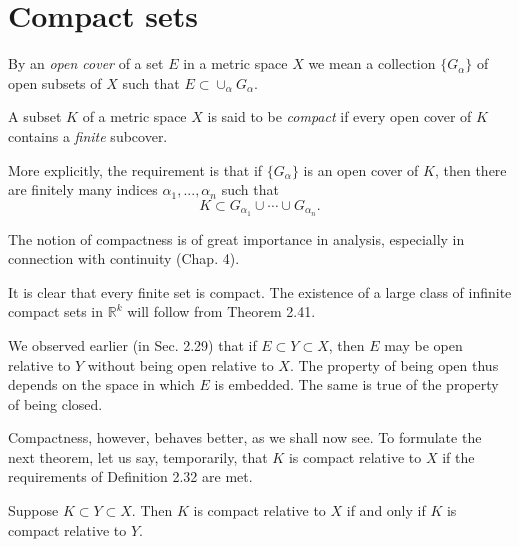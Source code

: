 \section{Compact sets}

\begin{myDefinition}
    \label{myDefinition:2.31 open cover}
    By an \emph{open cover} of a set $E$ in a metric space $X$ we mean a collection $\{G_{\alpha}\}$ of open subsets of $X$ such that $E \subset \cup_{\alpha} G_{\alpha}$.
\end{myDefinition}

\begin{myDefinition}
    \label{myDefinition:2.32 compact set}
    A subset $K$ of a metric space $X$ is said to be \emph{compact} if every open cover of $K$ contains a \emph{finite} subcover.
\end{myDefinition}

More explicitly, the requirement is that if $\{G_{\alpha}\}$ is an open cover of $K$, then there are finitely many indices $\alpha_1, ..., \alpha_n$ such that
\begin{equation*}
    K \subset G_{\alpha_{1}} \cup \cdots \cup G_{\alpha_{n}}.
\end{equation*}

The notion of compactness is of great importance in analysis, especially
in connection with continuity (Chap. 4).

It is clear that every finite set is compact. The existence of a large class of infinite compact sets in $\mathbb{R}^k$ will follow from Theorem 2.41.

We observed earlier (in Sec. 2.29) that if $E \subset Y \subset X$, then $E$ may be open relative to $Y$ without being open relative to $X$. The property of being open thus depends on the space in which $E$ is embedded. The same is true of the property of being closed.

Compactness, however, behaves better, as we shall now see. To formulate the next theorem, let us say, temporarily, that $K$ is compact relative to $X$ if the requirements of Definition 2.32 are met.

\begin{thm}
    \label{thm:2.33 compact relative}
    Suppose $K \subset Y \subset X$. Then $K$ is compact relative to $X$ if and only if $K$ is compact relative to $Y$.
\end{thm}

